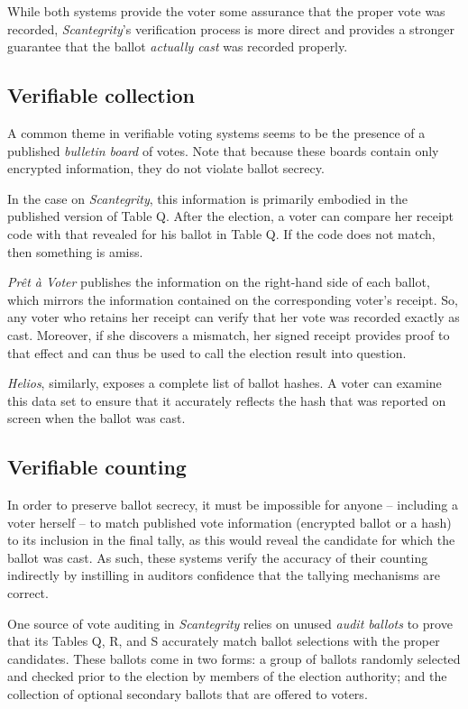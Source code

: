 \documentclass[10pt,twocolumn]{article}
\newcommand{\term}[1]{\textit{#1}}
\newcommand{\preta}{Pr\^{e}t \`{a}}
\newcommand{\pv}{\preta{} Voter}
\begin{document}
While both systems provide the voter some assurance that the proper vote was recorded, \term{Scantegrity}'s
verification process is more direct and provides a stronger guarantee that the ballot \emph{actually
cast} was recorded properly.

\subsection{Verifiable collection}

A common theme in verifiable voting systems seems to be the presence of a published \term{bulletin
board} of votes. Note that because these boards contain only encrypted information, they do not
violate ballot secrecy.

In the case on \term{Scantegrity}, this information is primarily embodied in the published version of Table
Q. After the election, a voter can compare her receipt code with that revealed for his ballot in
Table Q. If the code does not match, then something is amiss.

\term{\pv{}} publishes the information on the right-hand side of each ballot, which mirrors the information contained on the corresponding voter's receipt.
So, any voter who retains her receipt can verify that her vote was recorded exactly as cast.
Moreover, if she discovers a mismatch, her signed receipt provides proof to that effect and can thus be used to call
the election result into question.

\term{Helios}, similarly, exposes a complete list of ballot hashes. A voter can examine this data set to
ensure that it accurately reflects the hash that was reported on screen when the ballot was cast.

\subsection{Verifiable counting}

In order to preserve ballot secrecy, it must be impossible for anyone -- including a voter
herself -- to match published vote information (encrypted ballot or a hash) to its inclusion in
the final tally, as this would reveal the candidate for which the ballot was cast. As such, these
systems verify the accuracy of their counting indirectly by instilling in auditors confidence that
the tallying mechanisms are correct.

One source of vote auditing in \term{Scantegrity} relies on unused \term{audit ballots} to prove that its
Tables Q, R, and S accurately match ballot selections with the proper candidates. These ballots come
in two forms: a group of ballots randomly selected and checked prior to the election by members of
the election authority; and the collection of optional secondary ballots that are offered to voters.
\end{document}
